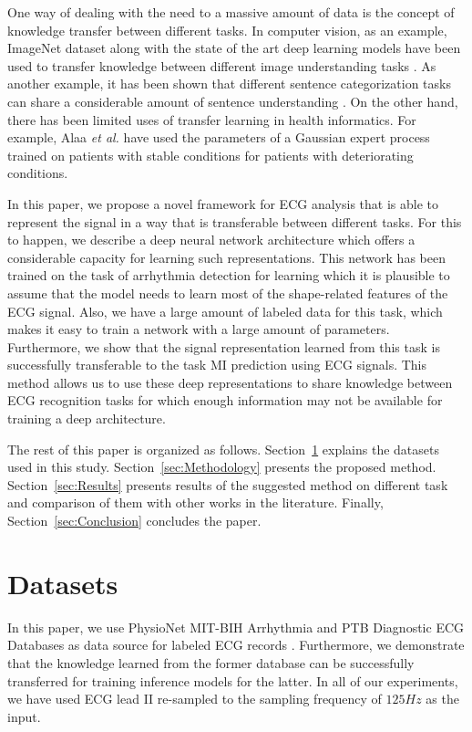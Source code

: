 \documentclass[10pt, conference, compsocconf]{IEEEtran}
\begin{document}
One way of dealing with the need to a massive amount of data is the concept of knowledge transfer between different tasks. In computer vision, as an example, ImageNet dataset along with the state of the art deep learning models have been used to transfer knowledge between different image understanding tasks \cite{Oquab2014LearningAT}. As another example, it has been shown that different sentence categorization tasks can share a considerable amount of sentence understanding \cite{Conneau}. On the other hand, there has been limited uses of transfer learning in health informatics. For example, Alaa \textit{et al.} \cite{alaa2018personalized} have used the parameters of a Gaussian expert process trained on patients with stable conditions for patients with deteriorating conditions.

In this paper, we propose a novel framework for ECG analysis that is able to represent the signal in a way that is transferable between different tasks. For this to happen, we describe a deep neural network architecture which offers a considerable capacity for learning such representations. This network has been trained on the task of arrhythmia detection for learning which it is plausible to assume that the model needs to learn most of the shape-related features of the ECG signal. Also, we have a large amount of labeled data for this task, which makes it easy to train a network with a large amount of parameters. Furthermore, we show that the signal representation learned from this task is successfully transferable to the task MI prediction using ECG signals. This method allows us to use these deep representations to share knowledge between ECG recognition tasks for which enough information may not be available for training a deep architecture.

The rest of this paper is organized as follows. Section~\ref{sec:Datasets} explains the datasets used in this study. Section~\ref{sec:Methodology} presents the proposed method. Section~\ref{sec:Results} presents results of the suggested method on different task and comparison of them with other works in the literature. Finally, Section~\ref{sec:Conclusion} concludes the paper.

\section{Datasets}
\label{sec:Datasets}
In this paper, we use PhysioNet MIT-BIH Arrhythmia and PTB Diagnostic ECG Databases as data source for labeled ECG records \cite{goldberger2000physiobank,moody2001impact,bousseljot1995nutzung}. Furthermore, we demonstrate that the knowledge learned from the former database can be successfully transferred for training inference models for the latter. In all of our experiments, we have used ECG lead II re-sampled to the sampling frequency of $125 Hz$ as the input.
\end{document}
